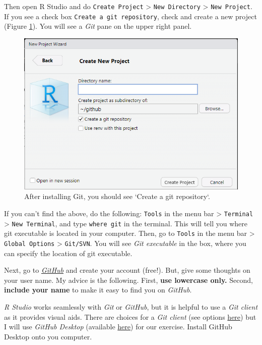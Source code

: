 \documentclass[
]{book}
\begin{document}
Then open R Studio and do \texttt{Create\ Project} \textgreater{} \texttt{New\ Directory} \textgreater{} \texttt{New\ Project}. If you see a check box \texttt{Create\ a\ git\ repository}, check and create a new project (Figure \ref{fig:gitcheck}). You will see a \emph{Git} pane on the upper right panel.

\begin{figure}

{\centering \includegraphics[width=8.24in]{image/git_image01} 

}

\caption{After installing Git, you should see `Create a git repository`.}\label{fig:gitcheck}
\end{figure}

If you can't find the above, do the following: \texttt{Tools} in the menu bar \textgreater{} \texttt{Terminal} \textgreater{} \texttt{New\ Terminal}, and type \texttt{where\ git} in the terminal. This will tell you where git executable is located in your computer. Then, go to \texttt{Tools} in the menu bar \textgreater{} \texttt{Global\ Options} \textgreater{} \texttt{Git/SVN}. You will see \emph{Git executable} in the box, where you can specify the location of git executable.

Next, go to \href{https://github.com/}{\emph{GitHub}} and create your account (free!). But, give some thoughts on your user name. My advice is the following. First, \textbf{use lowercase only.} Second, \textbf{include your name} to make it easy to find you on \emph{GitHub}.

\emph{R Studio} works seamlessly with \emph{Git} or \emph{GitHub}, but it is helpful to use a \emph{Git client} as it provides visual aids. There are choices for a \emph{Git client} (see options \href{https://happygitwithr.com/git-client.html}{here}) but I will use \emph{GitHub Desktop} (available \href{https://desktop.github.com/}{here}) for our exercise. Install GitHub Desktop onto you computer.
\end{document}
